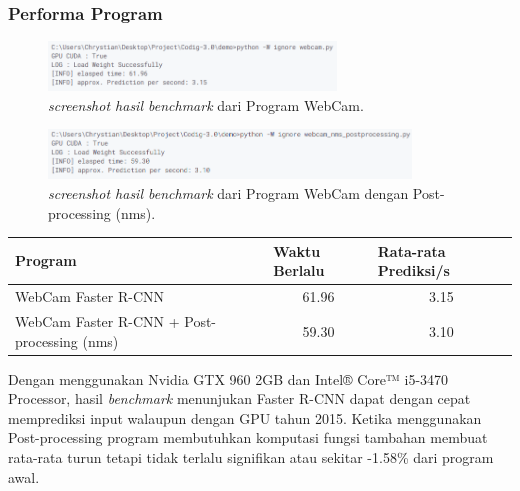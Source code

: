 \documentclass{article}
\begin{document}
  \subsubsection{Performa Program}

  
  
  \begin{figure}[H]
	\centering
	\includegraphics[height=50px]{benchmark/hasil1.png}
	\caption{\textit{screenshot hasil benchmark} dari Program WebCam.}
  \end{figure}

  \begin{figure}[H]
	\centering
	\includegraphics[height=50px]{benchmark/hasil2.png}
	\caption{\textit{screenshot hasil benchmark} dari Program WebCam dengan Post-processing (nms).}
  \end{figure}

  \begin{table}[H]
	\centering
	\begin{tabular}{lcc}
	\hline
	Program                                     & \multicolumn{1}{l}{Waktu Berlalu} & \multicolumn{1}{l}{Rata-rata Prediksi/s} \\ \hline
	WebCam Faster R-CNN                         & 61.96                             & 3.15                                     \\
	WebCam Faster R-CNN + Post-processing (nms) & 59.30                             & 3.10                                    
	\end{tabular}
	\end{table}

  Dengan menggunakan Nvidia GTX 960 2GB dan Intel® Core™ i5-3470 Processor, hasil \textit{benchmark} menunjukan Faster R-CNN dapat dengan cepat memprediksi input walaupun dengan GPU tahun 2015. Ketika menggunakan Post-processing program membutuhkan komputasi fungsi tambahan membuat rata-rata turun tetapi tidak terlalu signifikan atau sekitar -1.58\% dari program awal. 
\end{document}
